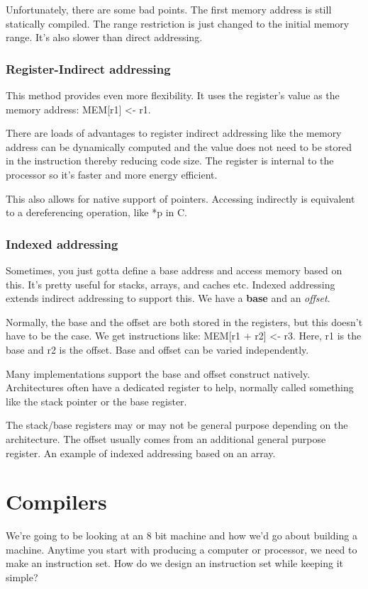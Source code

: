 \documentclass[11pt,a4paper,titlepage,dvipsnames,cmyk]{scrartcl}
\begin{document}
Unfortunately, there are some bad points. The first memory address is
still statically compiled. The range restriction is just changed to the
initial memory range. It's also slower than direct addressing.

\subsubsection{Register-Indirect addressing}%
\label{ssub:register-indirect}

This method provides even more flexibility. It uses the register's value
as the memory address: MEM[r1] <- r1.

There are loads of advantages to register indirect addressing like the
memory address can be dynamically computed and the value does not need to
be stored in the instruction thereby reducing code size. The register is
internal to the processor so it's faster and more energy efficient.

This also allows for native support of pointers. Accessing indirectly is
equivalent to a dereferencing operation, like *p in C.

\subsubsection{Indexed addressing}%
\label{ssub:indexed}
Sometimes, you just gotta define a base address and access memory based on
this. It's pretty useful for stacks, arrays, and caches etc. Indexed
addressing extends indirect addressing to support this. We have a
\textbf{base} and an \textit{offset}.

Normally, the base and the offset are both stored in the registers, but
this doesn't have to be the case. We get instructions like: MEM[r1 + r2]
<- r3. Here, r1 is the base and r2 is the offset. Base and offset can be
varied independently.

Many implementations support the base and offset construct natively.
Architectures often have a dedicated register to help, normally called
something like the stack pointer or the base register.

The stack/base registers may or may not be general purpose depending on
the architecture. The offset usually comes from an additional general
purpose register. An example of indexed addressing based on an array. 


\section{Compilers}%
\label{sec:Compilers}
We're going to be looking at an 8 bit machine and how we'd go about
building a machine. Anytime you start with producing a computer or
processor, we need to make an instruction set. How do we design an
instruction set while keeping it simple?
\end{document}

